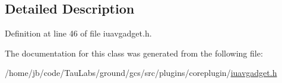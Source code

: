 

\subsection{\-Detailed \-Description}


\-Definition at line 46 of file iuavgadget.\-h.



\-The documentation for this class was generated from the following file\-:\begin{DoxyCompactItemize}
\item 
/home/jb/code/\-Tau\-Labs/ground/gcs/src/plugins/coreplugin/\hyperlink{iuavgadget_8h}{iuavgadget.\-h}\end{DoxyCompactItemize}
